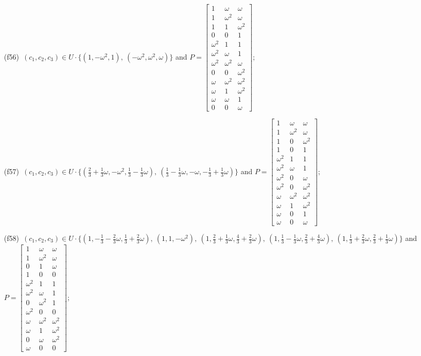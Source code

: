 \begin{enumerate}
\item[(f56)\,\newitem] $(c_1,c_2,c_3)\in U\cdot\{(1,-\omega^2,1),\allowbreak\ (-\omega^2,\omega^2,\omega)\}$ and $P=\begin{bmatrix}1&\omega&\omega\\1&\omega^2&\omega\\1&1&\omega^2\\0&0&1\\\omega^2&1&1\\\omega^2&\omega&1\\\omega^2&\omega^2&\omega\\0&0&\omega^2\\\omega&\omega^2&\omega^2\\\omega&1&\omega^2\\\omega&\omega&1\\0&0&\omega\end{bmatrix}$;
\item[(f57)\,\newitem] $(c_1,c_2,c_3)\in U\cdot\{(\tfrac{2}{3}+\tfrac{1}{3}\omega,-\omega^2,\tfrac{1}{3}-\tfrac{1}{3}\omega),\allowbreak\ (\tfrac{1}{3}-\tfrac{1}{3}\omega,-\omega,-\tfrac{1}{3}+\tfrac{1}{3}\omega)\}$ and $P=\begin{bmatrix}1&\omega&\omega\\1&\omega^2&\omega\\1&0&\omega^2\\1&0&1\\\omega^2&1&1\\\omega^2&\omega&1\\\omega^2&0&\omega\\\omega^2&0&\omega^2\\\omega&\omega^2&\omega^2\\\omega&1&\omega^2\\\omega&0&1\\\omega&0&\omega\end{bmatrix}$;
\item[(f58)\,\newitem] $(c_1,c_2,c_3)\in U\cdot\{(1,-\tfrac{1}{3}-\tfrac{2}{3}\omega,\tfrac{1}{3}+\tfrac{2}{3}\omega),\allowbreak\ (1,1,-\omega^2),\allowbreak\ (1,\tfrac{2}{3}+\tfrac{1}{3}\omega,\tfrac{4}{3}+\tfrac{2}{3}\omega),\allowbreak\ (1,\tfrac{1}{3}-\tfrac{1}{3}\omega,\tfrac{2}{3}+\tfrac{4}{3}\omega),\allowbreak\ (1,\tfrac{1}{3}+\tfrac{2}{3}\omega,\tfrac{2}{3}+\tfrac{1}{3}\omega)\}$ and $P=\begin{bmatrix}1&\omega&\omega\\1&\omega^2&\omega\\0&1&\omega\\1&0&0\\\omega^2&1&1\\\omega^2&\omega&1\\0&\omega^2&1\\\omega^2&0&0\\\omega&\omega^2&\omega^2\\\omega&1&\omega^2\\0&\omega&\omega^2\\\omega&0&0\end{bmatrix}$;

\end{enumerate}
